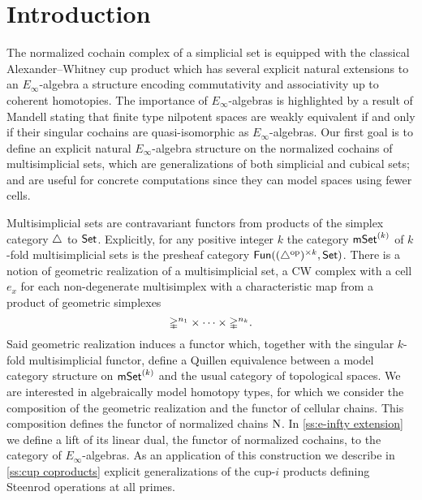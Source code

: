 
\section{Introduction} \label{s:introduction}

The normalized cochain complex of a simplicial set is equipped with the classical Alexander--Whitney cup product which has several explicit natural extensions to an $E_\infty$-algebra \cite{mcclure2003multivariable, berger2004combinatorial, medina2020prop1} a structure encoding commutativity and associativity up to coherent homotopies.
The importance of $E_\infty$-algebras is highlighted by a result of Mandell \cite{mandell2006homotopy_type} stating that finite type nilpotent spaces are weakly equivalent if and only if their singular cochains are quasi-isomorphic as $E_\infty$-algebras.
Our first goal is to define an explicit natural $E_\infty$-algebra structure on the normalized cochains of multisimplicial sets, which are generalizations of both simplicial and cubical sets; and are useful for concrete computations since they can model spaces using fewer cells.

Multisimplicial sets are contravariant functors from products of the simplex category $\triangle$ to $\mathsf{Set}$.
Explicitly, for any positive integer $k$ the category $\mathsf{mSet}^{(k)}$ of $k$-fold multisimplicial sets is the presheaf category $\mathsf{Fun}((\triangle^{\mathrm{op}})^{\times k}, \mathsf{Set})$.
There is a notion of geometric realization of a multisimplicial set, a CW complex with a cell $e_x$ for each non-degenerate multisimplex with a characteristic map from a product of geometric simplexes
\[
\mathbb{\Delta}^{n_1}\times\dots\times\mathbb{\Delta}^{n_k}.
\]
Said geometric realization induces a functor which, together with the singular $k$-fold multisimplicial functor, define a Quillen equivalence between a model category structure on $\mathsf{mSet}^{(k)}$ and the usual category of topological spaces.
We are interested in algebraically model homotopy types, for which we consider the composition of the geometric realization and the functor of cellular chains.
This composition defines the functor of normalized chains $\operatorname{N}$.
In \cref{ss:e-infty extension} we define a lift of its linear dual, the functor of normalized cochains, to the category of $E_\infty$-algebras.
As an application of this construction we describe in \cref{ss:cup coproducts} explicit generalizations of the cup-$i$ products defining Steenrod operations at all primes.

